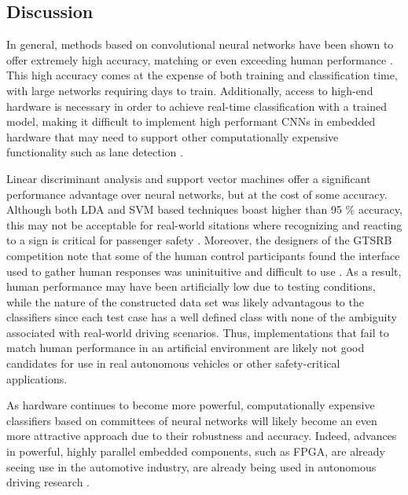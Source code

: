 \documentclass[letterpaper,twocolumn,10pt]{article}
\begin{document}
\subsection{Discussion}

In general, methods based on convolutional neural networks have been shown to offer extremely high accuracy, matching or even exceeding human performance \cite{ciresan_committee_2011, ciresan_multi-column_2012, sermanet_convolutional_2012, sermanet_traffic_2011}. This high accuracy comes at the expense of both training and classification time, with large networks requiring days to train. Additionally, access to high-end hardware is necessary in order to achieve real-time classification with a trained model, making it difficult to implement high performant CNNs in embedded hardware that may need to support other computationally expensive functionality such as lane detection \cite{ciresan_committee_2011, ciresan_multi-column_2012, lane-detection}.

Linear discriminant analysis and support vector machines offer a significant performance advantage over neural networks, but at the cost of some accuracy. Although both LDA and SVM based techniques boast higher than 95 \% accuracy, this may not be acceptable for real-world sitations where recognizing and reacting to a sign is critical for passenger safety \cite{}. Moreover, the designers of the GTSRB competition note that some of the human control participants found the interface used to gather human responses was uninituitive and difficult to use \cite{stallkamp_german_2011, stallkamp_man_2012}. As a result, human performance may have been artificially low due to testing conditions, while the nature of the constructed data set was likely advantagous to the classifiers since each test case has a well defined class with none of the ambiguity associated with real-world driving scenarios. Thus, implementations that fail to match human performance in an artificial environment are likely not good candidates for use in real autonomous vehicles or other safety-critical applications.

As hardware continues to become more powerful, computationally expensive classifiers based on committees of neural networks will likely become an even more attractive approach due to their robustness and accuracy. Indeed, advances in powerful, highly parallel embedded components, such as FPGA, are already seeing use in the automotive industry, are already being used in autonomous driving research \cite{fpga, fpga2}.
\end{document}

